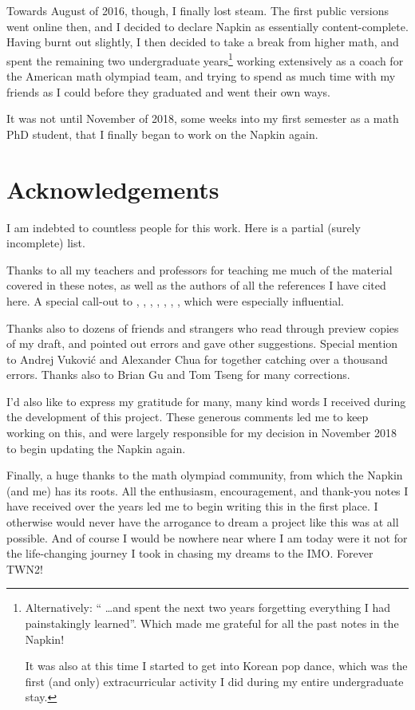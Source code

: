 Towards August of 2016, though, I finally lost steam.
The first public versions went online then,
and I decided to declare Napkin as essentially content-complete.
Having burnt out slightly,
I then decided to take a break from higher math,
and spent the remaining two undergraduate years\footnote{Alternatively:
	`` \dots and spent the next two years forgetting everything
	I had painstakingly learned''.
	Which made me grateful for all the past notes in the Napkin!

	It was also at this time I started to get into Korean pop dance,
	which was the first (and only) extracurricular activity
	I did during my entire undergraduate stay.}
working extensively as a coach for the American math olympiad team,
and trying to spend as much time with my friends as I could
before they graduated and went their own ways.

It was not until November of 2018,
some weeks into my first semester as a math PhD student,
that I finally began to work on the Napkin again.

\section*{Acknowledgements}
I am indebted to countless people for this work.
Here is a partial (surely incomplete) list.

\begin{itemize}
\ii Thanks to all my teachers and professors for teaching me much of the
material covered in these notes,
as well as the authors of all the references I have cited here.
A special call-out to \cite{ref:55a}, \cite{ref:msci},
\cite{ref:manifolds}, \cite{ref:gathmann}, \cite{ref:18-435},
\cite{ref:etingof}, \cite{ref:145a}, which were especially influential.

\ii Thanks also to dozens of friends and strangers
who read through preview copies of my draft,
and pointed out errors and gave other suggestions.
Special mention to Andrej Vukovi\'c and Alexander Chua
for together catching over a thousand errors.
Thanks also to Brian Gu and Tom Tseng for many corrections.

\ii I'd also like to express my gratitude for
many, many kind words I received
during the development of this project.
These generous comments led me to keep working on this,
and were largely responsible for my decision in November 2018
to begin updating the Napkin again.
\end{itemize}

Finally, a huge thanks to the math olympiad community,
from which the Napkin (and me) has its roots.
All the enthusiasm, encouragement, and thank-you notes I have received
over the years led me to begin writing this in the first place.
I otherwise would never have the arrogance to dream a project like this
was at all possible.
And of course I would be nowhere near where I am today were it not for the
life-changing journey I took in chasing my dreams to the IMO.
Forever TWN2!
